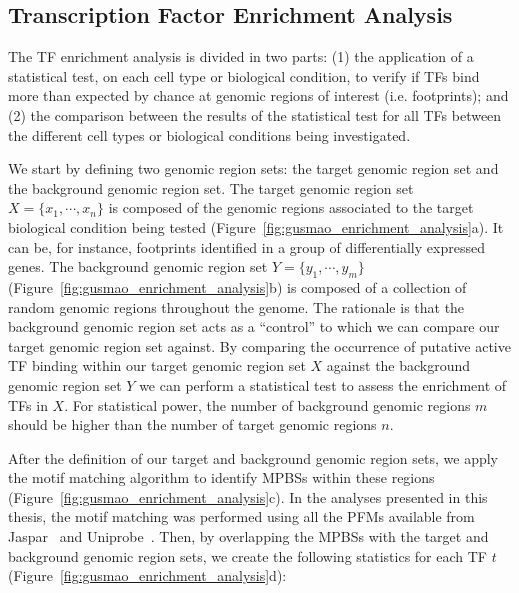 \subsection{Transcription Factor Enrichment Analysis}
\label{sec:transcription.factor.enrichment.analysis}

The TF enrichment analysis is divided in two parts: (1) the application of a statistical test, on each cell type or biological condition, to verify if TFs bind more than expected by chance at genomic regions of interest (i.e. footprints); and (2) the comparison between the results of the statistical test for all TFs between the different cell types or biological conditions being investigated.

We start by defining two genomic region sets: the target genomic region set and the background genomic region set. The target genomic region set $X = \{ x_1, \cdots, x_n \}$ is composed of the genomic regions associated to the target biological condition being tested (Figure~\ref{fig:gusmao_enrichment_analysis}a). It can be, for instance, footprints identified in a group of differentially expressed genes. The background genomic region set $Y = \{ y_1, \cdots, y_m \}$ (Figure~\ref{fig:gusmao_enrichment_analysis}b) is composed of a collection of random genomic regions throughout the genome. The rationale is that the background genomic region set acts as a ``control'' to which we can compare our target genomic region set against. By comparing the occurrence of putative active TF binding within our target genomic region set $X$ against the background genomic region set $Y$ we can perform a statistical test to assess the enrichment of TFs in $X$. For statistical power, the number of background genomic regions $m$ should be higher than the number of target genomic regions $n$.

After the definition of our target and background genomic region sets, we apply the motif matching algorithm to identify MPBSs within these regions (Figure~\ref{fig:gusmao_enrichment_analysis}c). In the analyses presented in this thesis, the motif matching was performed using all the PFMs available from Jaspar~\citep{mathelier2014} and Uniprobe~\citep{robasky2011}. Then, by overlapping the MPBSs with the target and background genomic region sets, we create the following statistics for each TF $t$ (Figure~\ref{fig:gusmao_enrichment_analysis}d):

